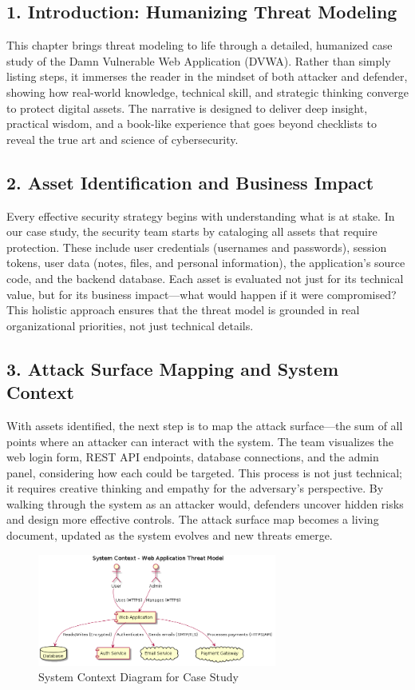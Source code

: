 

\subsection*{1. Introduction: Humanizing Threat Modeling}
This chapter brings threat modeling to life through a detailed, humanized case study of the Damn Vulnerable Web Application (DVWA)\cite{owasp}. Rather than simply listing steps, it immerses the reader in the mindset of both attacker and defender, showing how real-world knowledge, technical skill, and strategic thinking converge to protect digital assets. The narrative is designed to deliver deep insight, practical wisdom, and a book-like experience that goes beyond checklists to reveal the true art and science of cybersecurity.

\subsection*{2. Asset Identification and Business Impact}
Every effective security strategy begins with understanding what is at stake. In our case study, the security team starts by cataloging all assets that require protection. These include user credentials (usernames and passwords), session tokens, user data (notes, files, and personal information), the application’s source code, and the backend database\cite{nist800154}. Each asset is evaluated not just for its technical value, but for its business impact—what would happen if it were compromised? This holistic approach ensures that the threat model is grounded in real organizational priorities, not just technical details.

\subsection*{3. Attack Surface Mapping and System Context}
With assets identified, the next step is to map the attack surface—the sum of all points where an attacker can interact with the system\cite{owasp}. The team visualizes the web login form, REST API endpoints, database connections, and the admin panel, considering how each could be targeted. This process is not just technical; it requires creative thinking and empathy for the adversary’s perspective. By walking through the system as an attacker would, defenders uncover hidden risks and design more effective controls. The attack surface map becomes a living document, updated as the system evolves and new threats emerge.
\begin{figure}[H]
	\centering
	\includegraphics[width=0.7\textwidth]{images/system-context}
	\caption{System Context Diagram for Case Study}
\end{figure}

